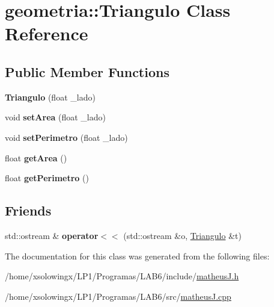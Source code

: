 \hypertarget{classgeometria_1_1Triangulo}{}\section{geometria\+:\+:Triangulo Class Reference}
\label{classgeometria_1_1Triangulo}
\subsection*{Public Member Functions}
\begin{DoxyCompactItemize}
\item 
\mbox{\label{classgeometria_1_1Triangulo_a68166e22cefc15f2ceaf2f2c2d92989e}} 
{\bfseries Triangulo} (float \+\_\+lado)
\item 
\mbox{\label{classgeometria_1_1Triangulo_aae43ee46e13e0079e84de9cf2ba69cf7}} 
void {\bfseries set\+Area} (float \+\_\+lado)
\item 
\mbox{\label{classgeometria_1_1Triangulo_a22d14d0d9eebf28a3febd8e2da2ffe57}} 
void {\bfseries set\+Perimetro} (float \+\_\+lado)
\item 
\mbox{\label{classgeometria_1_1Triangulo_a35608f9492dedc624f5be935b4712575}} 
float {\bfseries get\+Area} ()
\item 
\mbox{\label{classgeometria_1_1Triangulo_a1dc7d6bc5e2c21b5dd45e31247b3e3e3}} 
float {\bfseries get\+Perimetro} ()
\end{DoxyCompactItemize}
\subsection*{Friends}
\begin{DoxyCompactItemize}
\item 
\mbox{\label{classgeometria_1_1Triangulo_a79eb2d79fefc50a1d69e0a1c521dfe23}} 
std\+::ostream \& {\bfseries operator$<$$<$} (std\+::ostream \&o, \hyperlink{classgeometria_1_1Triangulo}{Triangulo} \&t)
\end{DoxyCompactItemize}


The documentation for this class was generated from the following files\+:\begin{DoxyCompactItemize}
\item 
/home/xsolowingx/\+L\+P1/\+Programas/\+L\+A\+B6/include/\hyperlink{matheusJ_8h}{matheus\+J.\+h}\item 
/home/xsolowingx/\+L\+P1/\+Programas/\+L\+A\+B6/src/\hyperlink{matheusJ_8cpp}{matheus\+J.\+cpp}\end{DoxyCompactItemize}
